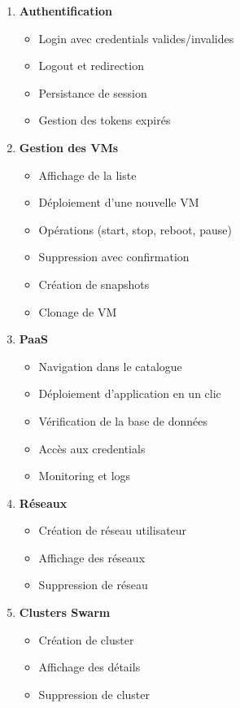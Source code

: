 \documentclass[12pt,a4paper]{article}
\begin{document}
\begin{successbox}
\begin{enumerate}
    \item \textbf{Authentification}
    \begin{itemize}
        \item Login avec credentials valides/invalides
        \item Logout et redirection
        \item Persistance de session
        \item Gestion des tokens expirés
    \end{itemize}
    
    \item \textbf{Gestion des VMs}
    \begin{itemize}
        \item Affichage de la liste
        \item Déploiement d'une nouvelle VM
        \item Opérations (start, stop, reboot, pause)
        \item Suppression avec confirmation
        \item Création de snapshots
        \item Clonage de VM
    \end{itemize}
    
    \item \textbf{PaaS}
    \begin{itemize}
        \item Navigation dans le catalogue
        \item Déploiement d'application en un clic
        \item Vérification de la base de données
        \item Accès aux credentials
        \item Monitoring et logs
    \end{itemize}
    
    \item \textbf{Réseaux}
    \begin{itemize}
        \item Création de réseau utilisateur
        \item Affichage des réseaux
        \item Suppression de réseau
    \end{itemize}
    
    \item \textbf{Clusters Swarm}
    \begin{itemize}
        \item Création de cluster
        \item Affichage des détails
        \item Suppression de cluster
    \end{itemize}
\end{enumerate}
\end{successbox}
\end{document}
